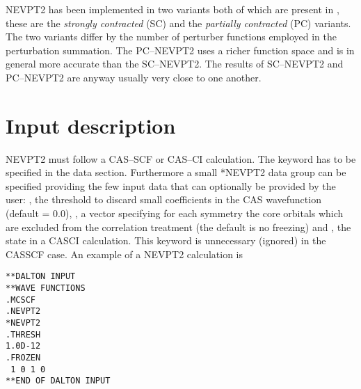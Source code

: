 NEVPT2 has been implemented in two variants both of which are present
in \dalton, these are the \emph{strongly contracted} (SC) and the
\emph{partially contracted} (PC) variants. The two variants differ by
the number of perturber functions employed in the perturbation
summation. The PC--NEVPT2 uses a richer function space and is
in general more accurate than the SC--NEVPT2. The results of
SC--NEVPT2 and PC--NEVPT2 are anyway usually very close to one
another.

\begin{center}
\end{center}

\section{Input description}\label{sec:nevpt2input}

NEVPT2 must follow a CAS--SCF or CAS--CI calculation. The keyword
 has to be specified in the  data
section. Furthermore a small {*NEVPT2} data group
 can be specified providing the few input data that can
optionally be provided by the user:
,
the threshold to discard small coefficients in the CAS wavefunction
(default = 0.0),
,
a vector specifying for each symmetry the core orbitals which are
excluded from the correlation treatment (the default is no
freezing) and
,
the state in a CASCI calculation. This keyword is unnecessary
(ignored) in the CASSCF case.
An example of a NEVPT2 calculation is

\begin{verbatim}
**DALTON INPUT
**WAVE FUNCTIONS
.MCSCF
.NEVPT2
*NEVPT2
.THRESH
1.0D-12
.FROZEN
 1 0 1 0
**END OF DALTON INPUT
\end{verbatim}
